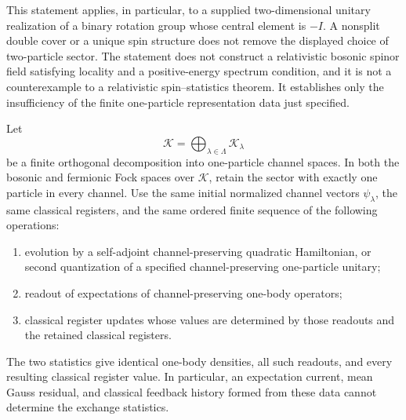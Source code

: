 This statement applies, in particular, to a supplied two-dimensional
unitary realization of a binary rotation group whose central element is
$-I$. A nonsplit double cover or a unique spin structure does not remove
the displayed choice of two-particle sector. The statement does not
construct a relativistic bosonic spinor field satisfying locality and a
positive-energy spectrum condition, and it is not a counterexample to a
relativistic spin--statistics theorem. It establishes only the insufficiency
of the finite one-particle representation data just specified.

\begin{proposition}
\label{prop:single-channel-statistics-boundary}
Let
\[
 \mathcal K=\bigoplus_{\lambda\in\Lambda}\mathcal K_\lambda
\]
be a finite orthogonal decomposition into one-particle channel spaces.
In both the bosonic and fermionic Fock spaces over $\mathcal K$, retain
the sector with exactly one particle in every channel. Use the same
initial normalized channel vectors $\psi_\lambda$, the same classical
registers, and the same ordered finite sequence of the following operations:
\begin{enumerate}
 \item evolution by a self-adjoint channel-preserving quadratic Hamiltonian,
 or second quantization of
 a specified channel-preserving one-particle unitary;
 \item readout of expectations of channel-preserving one-body operators;
 \item classical register updates whose values are determined by those
 readouts and the retained classical registers.
\end{enumerate}
The two statistics give identical one-body densities, all such readouts,
and every resulting classical register value. In particular, an
expectation current, mean Gauss residual, and classical feedback history
formed from these data cannot determine the exchange statistics.
\end{proposition}
